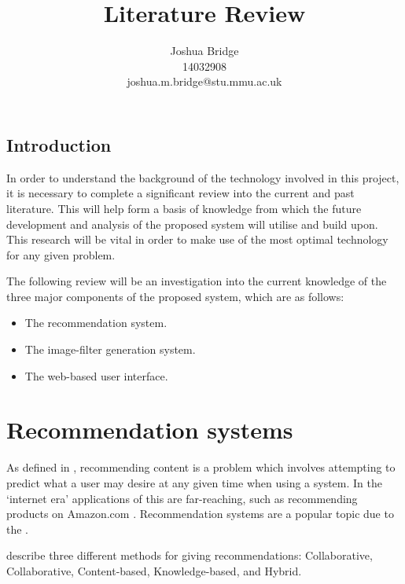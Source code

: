\documentclass[a4paper,12pt]{article}
\title{Literature Review}
\author{Joshua Bridge \\14032908 \\joshua.m.bridge@stu.mmu.ac.uk}
\begin{document}
\maketitle


\tableofcontents

\listoffigures

\doublespacing

\subsection{Introduction}
  In order to understand the background of the technology involved in this project, it is necessary to complete a significant review into the current and past literature. This will help form a basis of knowledge from which the future development and analysis of the proposed system will utilise and build upon. This research will be vital in order to make use of the most optimal technology for any given problem.

  The following review will be an investigation into the current knowledge of the three major components of the proposed system, which are as follows:

  \begin{itemize}
    \item The recommendation system.
    \item The image-filter generation system.
    \item The web-based user interface.
  \end{itemize}

\section{Recommendation systems}
  As defined in \cite{ricci2011introduction}, recommending content is a problem which involves attempting to predict what a user may desire at any given time when using a system. In the ‘internet era’ applications of this are far-reaching, such as recommending products on Amazon.com \cite{linden2003amazon}. Recommendation systems are a popular topic due to the  \citep{adomavicius2005toward}.

  \cite{jannach2010recommender} describe three different methods for giving recommendations: Collaborative, Collaborative, Content-based, Knowledge-based, and Hybrid.
\end{document}
